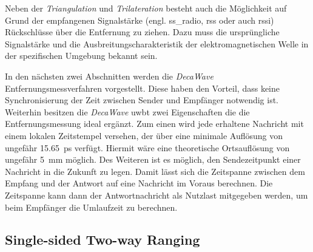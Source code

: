 Neben der \textit{Triangulation} und \textit{Trilateration} besteht auch die Möglichkeit auf Grund der empfangenen Signalstärke (engl. \acrfull{ss_radio}, \acrfull{rss} oder auch \acrfull{rssi}) Rückschlüsse über die Entfernung zu ziehen. Dazu muss die ursprüngliche Signalstärke und die Ausbreitungscharakteristik der elektromagnetischen Welle in der spezifischen Umgebung bekannt sein. \cite{gezici2005localization, decawave2014rtls}

In den nächsten zwei Abschnitten werden die \textit{DecaWave} Entfernungsmessverfahren vorgestellt. Diese haben den Vorteil, dass keine Synchronisierung der Zeit zwischen Sender und Empfänger notwendig ist. Weiterhin besitzen die \textit{DecaWave} \Gls{uwbt} zwei Eigenschaften die die Entfernungsmessung ideal ergänzt. Zum einen wird jede erhaltene Nachricht mit einem lokalen Zeitstempel versehen, der über eine minimale Auflösung von ungefähr \SI{15.65}{\pico\second} verfügt. Hiermit wäre eine theoretische Ortsauflösung von ungefähr \SI{5}{\milli\metre} möglich. Des Weiteren ist es möglich, den Sendezeitpunkt einer Nachricht in die Zukunft zu legen. Damit lässt sich die Zeitspanne zwischen dem Empfang und der Antwort auf eine Nachricht im Voraus berechnen. Die Zeitspanne kann dann der Antwortnachricht als Nutzlast mitgegeben werden, um beim Empfänger die Umlaufzeit zu berechnen.


%
%
\subsection{Single-sided Two-way Ranging}

